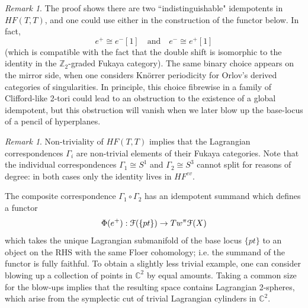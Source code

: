 \documentclass[reqno,10pt]{amsart}
\numberwithin{equation}{section}
\newcommand{\bC}{{\mathbb C}}
\newcommand{\bZ}{{\mathbb Z}}
\newcommand{\scrF}{\EuScript{F}}
\theoremstyle{remark}
\newtheorem{Remark}[thm]{Remark}
\begin{document}
\begin{Remark}
The proof shows there are two ``indistinguishable" idempotents in $HF(T,T)$, and one could use either in the construction of the functor below.  In fact, 
\[
e^+ \cong e^-[1] \quad \textrm{and} \quad e^- \cong e^+[1]
\] (which is compatible with the fact that the double shift is isomorphic to the identity in the $\bZ_2$-graded Fukaya category). The same binary choice appears on the mirror side, when one considers Kn\"orrer periodicity for Orlov's derived categories of singularities.  In principle, this choice fibrewise in a family of Clifford-like 2-tori could lead to an obstruction to the existence of a global idempotent, but this obstruction will vanish when we later blow up the base-locus of a pencil of hyperplanes.
\end{Remark}

\begin{Remark} \label{Rem:CorrNonZero}
Non-triviality of $HF(T,T)$ implies that the Lagrangian correspondences $\Gamma_i$ are non-trivial elements of their Fukaya categories.  Note that the individual correspondences $\Gamma_1 \cong S^1$ and $\Gamma_2\cong S^3$ cannot split for reasons of degree: in both cases only the identity lives in $HF^{ev}$. \end{Remark}

The composite correspondence $\Gamma_1 \circ \Gamma_2$ has an idempotent summand which defines a functor
\begin{equation} \label{Eqn:Embed}
\Phi(e^+): \scrF(\{pt\}) \rightarrow Tw^{\pi}\scrF(X)
\end{equation}
which takes the unique Lagrangian submanifold of the base locus $\{pt\}$ to an object on the RHS with the same Floer cohomology; i.e. the summand of the functor is fully faithful.  To obtain a slightly less trivial example, one can consider blowing up a collection of points in $\bC^2$ by equal amounts.  Taking a common size for the blow-ups implies that the resulting space contains Lagrangian 2-spheres, which arise from the symplectic cut of trivial Lagrangian cylinders in $\bC^2$.
\end{document}
